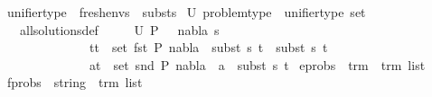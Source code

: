 \begin{isabellebody}
\isanewline
{}\isamarkupfalse%
\ unifier{\isacharunderscore}{\kern0pt}type\ {\isacharequal}{\kern0pt}\ {\isachardoublequoteopen}fresh{\isacharunderscore}{\kern0pt}envs\ {\isasymtimes}\ substs{\isachardoublequoteclose}\isanewline
\isanewline
{}\isamarkupfalse%
\ U{\isacharcolon}{\kern0pt}{\isacharcolon}{\kern0pt}\ {\isachardoublequoteopen}problem{\isacharunderscore}{\kern0pt}type\ {\isasymRightarrow}\ {\isacharparenleft}{\kern0pt}unifier{\isacharunderscore}{\kern0pt}type\ set{\isacharparenright}{\kern0pt}{\isachardoublequoteclose}\isanewline
\ \ \ all{\isacharunderscore}{\kern0pt}solutions{\isacharunderscore}{\kern0pt}def{\isacharcolon}{\kern0pt}\ \isanewline
\ \ \ \ {\isachardoublequoteopen}U\ P\ \ {\isasymequiv}\ {\isacharbraceleft}{\kern0pt}{\isacharparenleft}{\kern0pt}nabla{\isacharcomma}{\kern0pt}\ s{\isacharparenright}{\kern0pt}{\isachardot}{\kern0pt}\ \isanewline
\ \ \ \ \ \ \ \ \ \ \ \ \ {\isacharparenleft}{\kern0pt}{\isasymforall}\ {\isacharparenleft}{\kern0pt}t{}{\isacharcomma}{\kern0pt}t{}{\isacharparenright}{\kern0pt}\ {\isasymin}\ set\ {\isacharparenleft}{\kern0pt}fst\ P{\isacharparenright}{\kern0pt}{\isachardot}{\kern0pt}\ nabla\ {\isasymturnstile}\ subst\ s\ t{}\ {\isasymapprox}\ subst\ s\ t{}{\isacharparenright}{\kern0pt}\ {\isasymand}\ \isanewline
\ \ \ \ \ \ \ \ \ \ \ \ \ {\isacharparenleft}{\kern0pt}{\isasymforall}\ {\isacharparenleft}{\kern0pt}a{\isacharcomma}{\kern0pt}t{\isacharparenright}{\kern0pt}\ {\isasymin}\ set\ {\isacharparenleft}{\kern0pt}snd\ P{\isacharparenright}{\kern0pt}{\isachardot}{\kern0pt}\ nabla\ {\isasymturnstile}\ a\ {\isasymsharp}\ subst\ s\ t{\isacharparenright}{\kern0pt}{\isacharbraceright}{\kern0pt}{\isachardoublequoteclose}\isanewline
\isanewline
\isanewline
\isanewline
\isanewline
{}\isamarkupfalse%
\ eprobs\ {\isacharequal}{\kern0pt}\ {\isachardoublequoteopen}{\isacharparenleft}{\kern0pt}{\isacharparenleft}{\kern0pt}trm\ {\isasymtimes}\ trm{\isacharparenright}{\kern0pt}\ list{\isacharparenright}{\kern0pt}{\isachardoublequoteclose}\isanewline
{}\isamarkupfalse%
\ fprobs\ {\isacharequal}{\kern0pt}\ {\isachardoublequoteopen}{\isacharparenleft}{\kern0pt}{\isacharparenleft}{\kern0pt}string\ {\isasymtimes}\ trm{\isacharparenright}{\kern0pt}\ list{\isacharparenright}{\kern0pt}{\isachardoublequoteclose}\isanewline
{}\isamarkupfalse%

\end{isabellebody}
